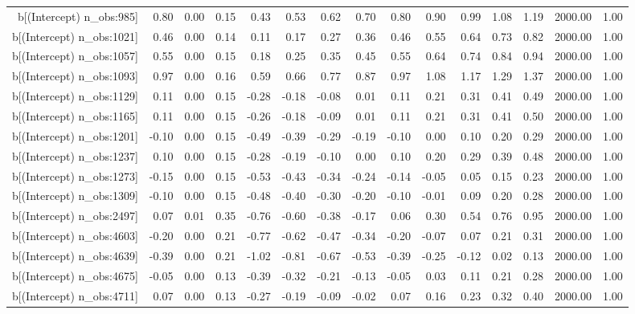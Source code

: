 \begin{table}[ht]
\begin{tabular}{rrrrrrrrrrrrrrr}
  b[(Intercept) n\_obs:985] & 0.80 & 0.00 & 0.15 & 0.43 & 0.53 & 0.62 & 0.70 & 0.80 & 0.90 & 0.99 & 1.08 & 1.19 & 2000.00 & 1.00 \\ 
  b[(Intercept) n\_obs:1021] & 0.46 & 0.00 & 0.14 & 0.11 & 0.17 & 0.27 & 0.36 & 0.46 & 0.55 & 0.64 & 0.73 & 0.82 & 2000.00 & 1.00 \\ 
  b[(Intercept) n\_obs:1057] & 0.55 & 0.00 & 0.15 & 0.18 & 0.25 & 0.35 & 0.45 & 0.55 & 0.64 & 0.74 & 0.84 & 0.94 & 2000.00 & 1.00 \\ 
  b[(Intercept) n\_obs:1093] & 0.97 & 0.00 & 0.16 & 0.59 & 0.66 & 0.77 & 0.87 & 0.97 & 1.08 & 1.17 & 1.29 & 1.37 & 2000.00 & 1.00 \\ 
  b[(Intercept) n\_obs:1129] & 0.11 & 0.00 & 0.15 & -0.28 & -0.18 & -0.08 & 0.01 & 0.11 & 0.21 & 0.31 & 0.41 & 0.49 & 2000.00 & 1.00 \\ 
  b[(Intercept) n\_obs:1165] & 0.11 & 0.00 & 0.15 & -0.26 & -0.18 & -0.09 & 0.01 & 0.11 & 0.21 & 0.31 & 0.41 & 0.50 & 2000.00 & 1.00 \\ 
  b[(Intercept) n\_obs:1201] & -0.10 & 0.00 & 0.15 & -0.49 & -0.39 & -0.29 & -0.19 & -0.10 & 0.00 & 0.10 & 0.20 & 0.29 & 2000.00 & 1.00 \\ 
  b[(Intercept) n\_obs:1237] & 0.10 & 0.00 & 0.15 & -0.28 & -0.19 & -0.10 & 0.00 & 0.10 & 0.20 & 0.29 & 0.39 & 0.48 & 2000.00 & 1.00 \\ 
  b[(Intercept) n\_obs:1273] & -0.15 & 0.00 & 0.15 & -0.53 & -0.43 & -0.34 & -0.24 & -0.14 & -0.05 & 0.05 & 0.15 & 0.23 & 2000.00 & 1.00 \\ 
  b[(Intercept) n\_obs:1309] & -0.10 & 0.00 & 0.15 & -0.48 & -0.40 & -0.30 & -0.20 & -0.10 & -0.01 & 0.09 & 0.20 & 0.28 & 2000.00 & 1.00 \\ 
  b[(Intercept) n\_obs:2497] & 0.07 & 0.01 & 0.35 & -0.76 & -0.60 & -0.38 & -0.17 & 0.06 & 0.30 & 0.54 & 0.76 & 0.95 & 2000.00 & 1.00 \\ 
  b[(Intercept) n\_obs:4603] & -0.20 & 0.00 & 0.21 & -0.77 & -0.62 & -0.47 & -0.34 & -0.20 & -0.07 & 0.07 & 0.21 & 0.31 & 2000.00 & 1.00 \\ 
  b[(Intercept) n\_obs:4639] & -0.39 & 0.00 & 0.21 & -1.02 & -0.81 & -0.67 & -0.53 & -0.39 & -0.25 & -0.12 & 0.02 & 0.13 & 2000.00 & 1.00 \\ 
  b[(Intercept) n\_obs:4675] & -0.05 & 0.00 & 0.13 & -0.39 & -0.32 & -0.21 & -0.13 & -0.05 & 0.03 & 0.11 & 0.21 & 0.28 & 2000.00 & 1.00 \\ 
  b[(Intercept) n\_obs:4711] & 0.07 & 0.00 & 0.13 & -0.27 & -0.19 & -0.09 & -0.02 & 0.07 & 0.16 & 0.23 & 0.32 & 0.40 & 2000.00 & 1.00 \\ 

\end{tabular}
\end{table}
